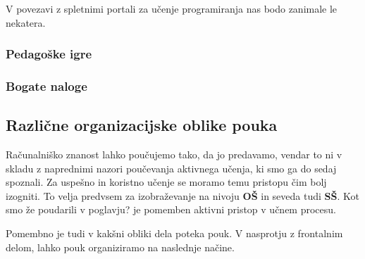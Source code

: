V povezavi z spletnimi portali za učenje programiranja nas bodo
zanimale le nekatera.

\subsubsection{Pedagoške igre}
\label{sec:pedagoške_igre}

\subsubsection{Bogate naloge}
\label{sec:bogate_naloge}

\subsection{Različne organizacijske oblike pouka}
\label{sec:različne_oblike_pouka}

Računalniško znanost lahko poučujemo tako, da jo predavamo, vendar to
ni v skladu z naprednimi nazori poučevanja aktivnega učenja, ki smo ga
do sedaj spoznali. Za uspešno in koristno učenje se moramo temu
pristopu čim bolj izogniti. To velja predvsem za izobraževanje na
nivoju \textbf{OŠ} in seveda tudi \textbf{SŠ}. Kot smo že poudarili v
poglavju? je pomemben aktivni pristop v učnem procesu.

Pomembno je tudi v kakšni obliki dela poteka pouk. V nasprotju z
frontalnim delom, lahko pouk organiziramo na naslednje načine.

